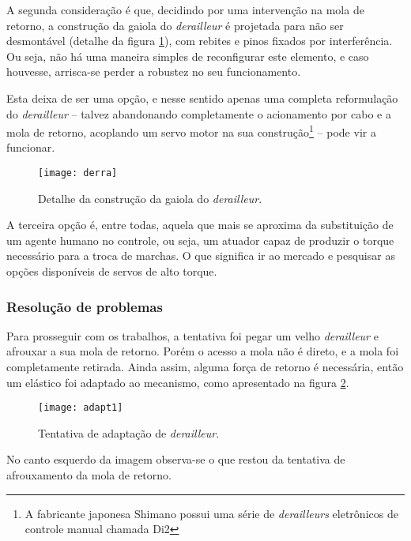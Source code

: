 \documentclass[a4paper,11pt]{article}
\begin{document}
A segunda consideração é que, decidindo por uma intervenção na mola de retorno,
a construção da gaiola do \textit{derailleur} é projetada para não ser
desmontável (detalhe da figura \ref{fig:derra}), com rebites e pinos
fixados por interferência. Ou seja, não há uma maneira simples de reconfigurar
este elemento, e caso houvesse, arrisca-se perder a robustez no seu
funcionamento.

Esta deixa de ser uma opção, e nesse sentido apenas uma completa
reformulação do \textit{derailleur} -- talvez abandonando completamente o
acionamento por cabo e a mola de retorno, acoplando um servo motor na sua
construção\footnote{A fabricante japonesa Shimano possui uma série de
\textit{derailleurs} eletrônicos de controle manual chamada Di2} -- pode vir a
funcionar.

\begin{figure}[h!]
\begin{center}
 \texttt{[image: derra]}
\end{center}
  \caption{Detalhe da construção da gaiola do \textit{derailleur}.}
  \label{fig:derra}
\end{figure}

A terceira opção é, entre todas, aquela que mais se aproxima da substituição de
um agente humano no controle, ou seja, um atuador capaz de produzir o torque
necessário para a troca de marchas. O que significa ir ao mercado e pesquisar
as opções disponíveis de servos de alto torque.

\subsubsection{Resolução de problemas}
Para prosseguir com os trabalhos, a tentativa foi pegar um velho
\textit{derailleur} e afrouxar a sua mola de retorno. Porém o acesso a mola não
é direto, e a mola foi completamente retirada. Ainda assim, alguma força de
retorno é necessária, então um elástico foi adaptado ao mecanismo, como
apresentado na figura \ref{fig:adapt1}.

\begin{figure}[h!]
\begin{center}
 \texttt{[image: adapt1]}
\end{center}
  \caption{Tentativa de adaptação de \textit{derailleur}.}
  \label{fig:adapt1}
\end{figure}

No canto esquerdo da imagem observa-se o que restou da tentativa de
afrouxamento da mola de retorno.
\end{document}
